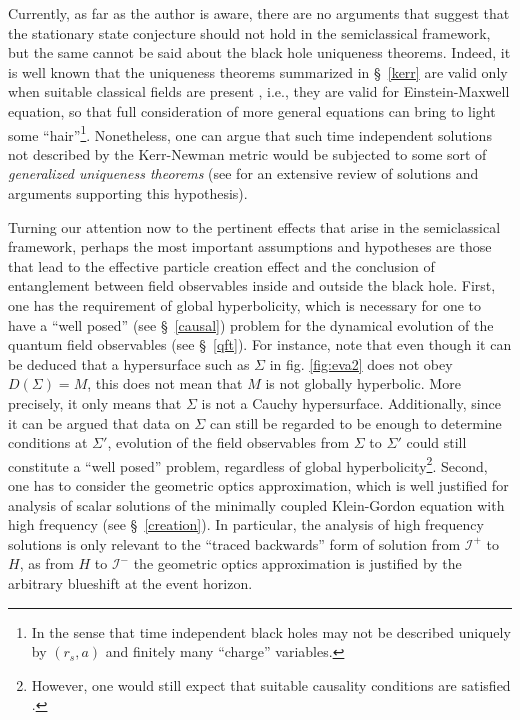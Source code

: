 \documentclass[
12pt,		%
openright,	%
twoside,  %
a4paper,			%
chapter=TITLE,		%
english,			%
french,				%
spanish,			%
brazil				%
]{USPSC-classe/USPSC}
\begin{document}
Currently, as far as the author is aware, there are no arguments that suggest that the stationary state conjecture should not hold in the semiclassical framework, but the same cannot be said about the black hole uniqueness theorems. Indeed, it is well known that the uniqueness theorems summarized in \S~\ref{kerr} are valid only when suitable classical fields are present \cite{Wald1984}, i.e., they are valid for Einstein-Maxwell equation, so that full consideration of more general equations can bring to light some ``hair''\footnote{In the sense that time independent black holes may not be described uniquely by $(r_s,a)$ and finitely many ``charge'' variables.}. Nonetheless, one can argue that such time independent solutions not described by the Kerr-Newman metric would be subjected to some sort of \textit{generalized uniqueness theorems} (see \cite{Chruściel2012} for an extensive review of solutions and arguments supporting this hypothesis). 

Turning our attention now to the pertinent effects that arise in the semiclassical framework, perhaps the most important assumptions and hypotheses are those that lead to the effective particle creation effect and the conclusion of entanglement between field observables inside and outside the black hole. First, one has the requirement of global hyperbolicity, which is necessary for one to have a ``well posed'' (see \S~\ref{causal}) problem for the dynamical evolution of the quantum field observables (see \S~\ref{qft}). For instance, note that even though it can be deduced that a hypersurface such as $\Sigma$ in fig. \ref{fig:eva2} does not obey $D(\Sigma)=M$, this does not mean that $M$ is not globally hyperbolic. More precisely, it only means that $\Sigma$ is not a Cauchy hypersurface. Additionally, since it can be argued that data on $\Sigma$ can still be regarded to be enough to determine conditions at $\Sigma'$, evolution of the field observables from $\Sigma$ to $\Sigma'$ could still constitute a ``well posed'' problem, regardless of global hyperbolicity\footnote{However, one would still expect that suitable causality conditions are satisfied \cite{Lesourd2019}.}. Second, one has to consider the geometric optics approximation, which is well justified for analysis of scalar solutions of the minimally coupled Klein-Gordon equation with high frequency (see \S~\ref{creation}). In particular, the analysis of high frequency solutions is only relevant to the ``traced backwards'' form of solution from $\mathscr{I}^+$ to $H$, as from $H$ to $\mathscr{I}^-$ the geometric optics approximation is justified by the arbitrary blueshift at the event horizon.
\end{document}

